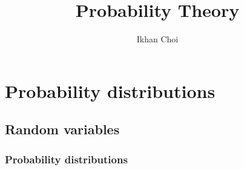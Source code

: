 \documentclass{../../large}
\begin{document}
\title{Probability Theory}
\author{Ikhan Choi}
\maketitle
\tableofcontents


\part{Probability distributions}


\chapter{Random variables}

\section{Probability distributions}
\end{document}
